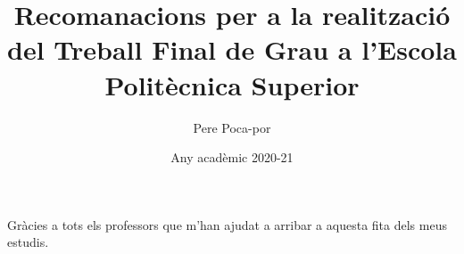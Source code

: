 \documentclass[]{TFGEPSUIB}
\title{Recomanacions per a la realització del Treball Final de Grau a l'Escola Politècnica Superior}
\author{Pere Poca-por}
\date{Any acadèmic 2020-21}
\begin{document}
\portada
\portadainterior
\frontmatter

%
\cleartorecto \thispagestyle{empty}
\begin{agraiments}
Gràcies a tots els professors que m'han ajudat a arribar a aquesta fita dels meus estudis.
\end{agraiments}

\cleartorecto \tableofcontents


 

 

\mainmatter\pagestyle{ruled}











\appendix 
 



\backmatter



 
\end{document}
